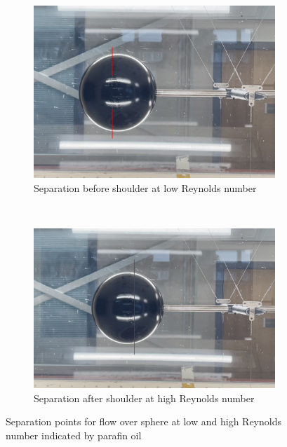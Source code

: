\documentclass[8pt]{article}
\begin{document}
\begin{figure}[H]
    \centering
    \begin{subfigure}[t]{0.45\textwidth}
        \centering
        \includegraphics[width=1\textwidth]{Images_Videos/early_seperation_annotated.jpg}
        \caption{Separation before shoulder at low Reynolds number}
        \label{fig:figure2}
    \end{subfigure}
    ~
    \begin{subfigure}[t]{0.48\textwidth}
        \centering
        \includegraphics[width=1\textwidth]{Images_Videos/late_seperation_annotated.jpg}
        \caption{Separation after shoulder at high Reynolds number}
        \label{fig:figure3}
    \end{subfigure}
    \caption{Separation points for flow over sphere at low and high Reynolds number indicated by parafin oil}
\end{figure}
\end{document}
